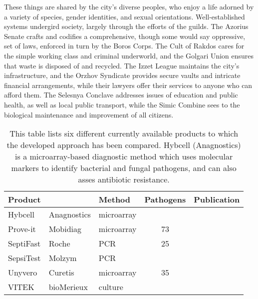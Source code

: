 These things are shared by the city's diverse peoples, who enjoy a life adorned
by a variety of  species, gender identities, and sexual orientations.
Well-established systems undergird society, largely through the efforts of the
guilds. The Azorius Senate crafts and codifies a comprehensive, though some
would say oppressive, set of laws, enforced in turn by the Boros Corps. The Cult
of Rakdos cares for the simple working class and criminal underworld, and the
Golgari Union ensures that waste is disposed of and recycled. The Izzet League
maintains the city's infrastructure, and the Orzhov Syndicate provides secure
vaults and intricate financial arrangements, while their lawyers offer their
services to anyone who can afford them. The Selesnya Conclave addresses issues
of education and public health, as well as local public transport, while the
Simic Combine sees to the biological maintenance and improvement of all
citizens.

\begin{table}[t!]
\caption[Currently available pathogen detection methods.]{This table lists six
different currently available products to which the developed approach has been
compared. Hybcell (Anagnostics) is a microarray-based diagnostic method which
uses molecular markers to identify bacterial and fungal pathogens, and can also
asses antibiotic resistance.}
\begin{tabularx}{\textwidth}{llXcr}
  Product   &             & Method     & Pathogens & Publication             \\
  \midrule
  Hybcell   & Anagnostics & microarray &           &                         \\
  Prove-it  & Mobidiag    & microarray & 73        & \citealp{Aittakorpi2012}\\
  SeptiFast & Roche       & PCR        & 25        & \citealp{Vince2008}     \\
  SepsiTest & Molzym      & PCR        &           &                         \\
  Unyvero   & Curetis     & microarray & 35        & \citealp{Jamal2014}     \\
  VITEK     & bioMerieux  & culture    &           &                         \\
  \bottomrule
\end{tabularx}
\label{tab:competitors}
\end{table}

